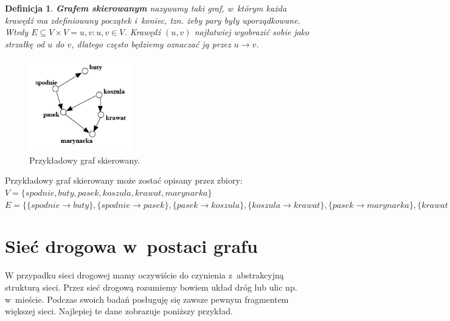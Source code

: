 \documentclass[twoside,12pt]{report}
\newtheorem{definition}{Definicja} %
\begin{document}
\vspace*{30px}
\begin{definition}\label{Graf skierowany}
\textbf{Grafem skierowanym} nazywamy taki graf, w~którym każda krawędź ma zdefiniowany początek i~koniec, tzn. żeby pary były uporządkowane. Wtedy $E \subseteq V \times V = {{u,v}:u,v \in V}$.
Krawędź $(u,v)$ najłatwiej wyobrazić sobie jako strzałkę od $u$ do $v$, dlatego często będziemy oznaczać ją przez $u \rightarrow v$\cite{grafy}.
\end{definition}

\begin{figure}[ht]
\begin{center}
\includegraphics[width=0.40\textwidth]{img/graf2}
\caption{Przykładowy graf skierowany.} 
\end{center}
\end{figure}

Przykładowy graf skierowany może zostać opisany przez zbiory:
\newline
\begin{math}
V=\{spodnie, buty, pasek, koszula, krawat, marynarka\}
\end{math}
\newline
\begin{math}
E=\{\{spodnie \rightarrow buty\},\{spodnie  \rightarrow pasek\},
	\{pasek \rightarrow koszula\},\{koszula \rightarrow krawat\},
	\{pasek \rightarrow marynarka\},\{krawat \rightarrow marynarka\}\}
\end{math}

\section{Sieć drogowa w~postaci grafu}
W przypadku sieci drogowej mamy oczywiście do czynienia z~abstrakcyjną strukturą sieci. Przez sieć drogową rozumiemy bowiem układ dróg lub ulic np. w~mieście. Podczas swoich badań posługuję się zawsze pewnym fragmentem większej sieci. Najlepiej te dane zobrazuje poniższy przykład.
\end{document}
